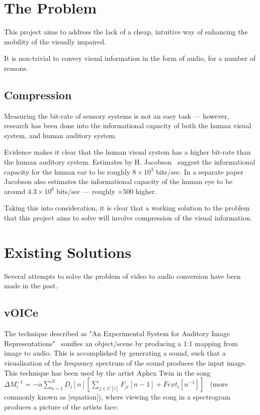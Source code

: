 \section{The Problem}
This project aims to address the lack of a cheap, intuitive way of enhancing the mobility of the visually impaired.

It is non-trivial to convey visual information in the form of audio, for a number of reasons.

\subsection{Compression}
\label{sec:compression}
Measuring the bit-rate of sensory systems is not an easy task --- however, research has been done into the informational capacity of both the human visual system, and human auditory system.

Evidence makes it clear that the human visual system has a higher bit-rate than the human auditory system. Estimates by H. Jacobson~\cite{jacobson1950informational} suggest the informational capacity for the human ear to be roughly $8\times10^3$ bits/sec. In a separate paper~\cite{jacobson1951informational} Jacobson also estimates the informational capacity of the human eye to be around $4.3\times10^6$ bits/sec --- roughly $\times500$ higher. 

Taking this into consideration, it is clear that a working solution to the problem that this project aims to solve will involve compression of the visual information. 

\section{Existing Solutions}
Several attempts to solve the problem of video to audio conversion have been made in the past.

\subsection{vOICe}
The technique described as "An Experimental System for Auditory Image Representations"~\cite{vOICe} sonifies an object/scene by producing a 1:1 mapping from image to audio. This is accomplished by generating a sound, such that a visualisation of the frequency spectrum of the sound produces the input image. This technique has been used by the artist Aphex Twin in the song $\Delta M_i^{-1} = - \alpha \sum_{n=1}^N D_i \left[ n \right] \left[ \sum_{j \in C \left[ i \right]}^{} F_{ji} \left[ n -1 \right] + Fext_i \left[ n^{-1} \right] \right]$~\cite{aphex-equation} (more commonly known as [equation]), where viewing the song in a spectrogram produces a picture of the artists face:

